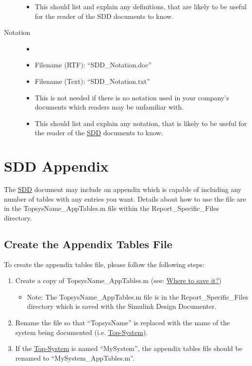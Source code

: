 \documentclass{mcscert}
\newcommand{\sddtool}{Simulink Design Documenter}
\newcommand{\topsystemnolink}{Top-System} %
\newcommand{\topsystem}{\hyperref[def:topsystem]{\topsystemnolink{}}}
\begin{document}
\begin{description}
\begin{itemize}
		  \item This should list and explain any definitions, that are likely to be useful for the reader of the SDD documents to know.
		\end{itemize}
		\item[Notation\label{itm:notation}]
		\begin{itemize}
		  \item[]
		  \item Filename (RTF): ``SDD\_Notation.doc''
		  \item Filename (Text): ``SDD\_Notation.txt''
		  \item This is not needed if there is no notation used in your company's documents which readers may be unfamiliar with.
		  \item This should list and explain any notation, that is likely to be useful for the reader of the \hyperref[acr:sdd]{SDD} documents to know.
		\end{itemize}
  \end{description}

\section{SDD Appendix}
\label{sec:sdd-app}
The \hyperref[acr:sdd]{SDD} document may include an appendix which is capable of including any number of tables with any entries you want. 
Details about how to use the file are in the TopsysName\_AppTables.m file within the Report\_Specific\_Files directory.

	  \subsection{Create the Appendix Tables File}
	  \label{ssec:create-appendix}
		To create the appendix tables file, please follow the following steps:
		
	  \begin{enumerate}
	    \item Create a copy of TopsysName\_AppTables.m (see: \hyperref[sec:where-save]{Where to save it?})
	    \begin{itemize}
	      \item Note: The TopsysName\_AppTables.m file is in the Report\_Specific\_Files directory which is saved with the \sddtool{}.
	    \end{itemize}
			\item Rename the file so that ``TopsysName'' is replaced with the name of the system being documented (i.e. \topsystem{}).
			\item If the \topsystem{} is named ``MySystem'', the appendix tables file should be renamed to ``MySystem\_AppTables.m''.
	  \end{enumerate}
\end{document}
